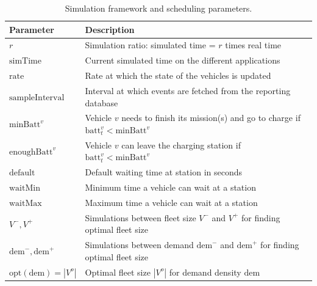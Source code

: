 \documentclass[12pt,a4paper]{article}
\begin{document}
\begin{table}

  \centering
\begin{tabularx}{\linewidth}{| l | Y |} 
  \hline			
 Parameter & Description \\
\hline	  
  $r$ & Simulation ratio: simulated time = $r$ times real time\\
  $\text{simTime}$ & Current simulated time on the different applications \\
  $\text{rate}$ & Rate at which the state of the vehicles is updated \\
  $\text{sampleInterval}$ & Interval at which events are fetched from the reporting database \\
  $\text{minBatt}^{v}$ & Vehicle $v$ needs to finish its mission(s) and go to charge if $\text{batt}^{v}_{t} < \text{minBatt}^{v}$\\
  $\text{enoughBatt}^{v} $& Vehicle $v$ can leave the charging station if $\text{batt}^{v}_{t} < \text{minBatt}^{v}$\\
  $\text{default}$ & Default waiting time at station in seconds\\
    $\text{waitMin}$ & Minimum time a vehicle can wait at a station\\
  $\text{waitMax}$ & Maximum time a vehicle can wait at a station\\
  $V^{-}, V^{+}$ & Simulations between fleet size $V^{-}$ and $V^{+}$ for finding optimal fleet size \\
    $\text{dem}^{-}, \text{dem}^{+}$ & Simulations between demand $\text{dem}^{-}$ and $\text{dem}^{+}$ for finding optimal fleet size \\
    $\text{opt}(\text{dem}) = | V^{o}|$ & Optimal fleet size $|V^{o}|$ for demand density $\text{dem}$ \\
  
  \hline  
\end{tabularx}

\caption{Simulation framework and scheduling parameters.}
\label{table:simparameters}
\end{table}
\end{document}

